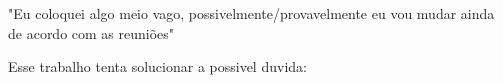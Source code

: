 {"Eu coloquei algo meio vago, possivelmente/provavelmente eu vou mudar ainda de acordo com as reuniões"}


Esse trabalho tenta solucionar a possivel duvida: 